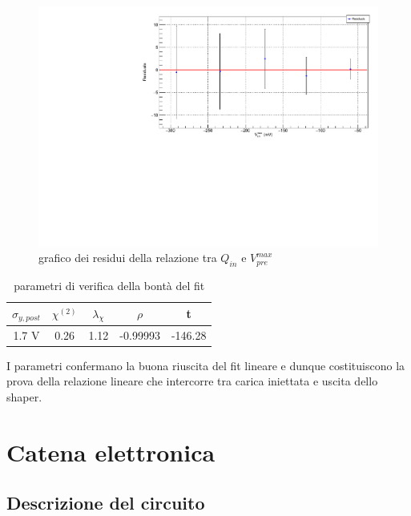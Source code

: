 \documentclass{article}
\begin{document}
\begin{center}
    \begin{figure}[H]
    \centering
    \includegraphics[scale=0.375, angle=0]{residuishaper.pdf}
    \caption{grafico dei residui della relazione tra $Q_{in}$ e $V_{pre}^{max}$}
    \label{fig:residuishaper}
    \end{figure}
\end{center}

\begin{table}[ht]
    \centering
    \begin{tabular}{ccccc}
        \toprule
        $\sigma_{y, post}$    &$\chi^{(2)}$    &$\lambda_{\chi}$   &$\rho$  &t   \\
        \midrule
        1.7 V               &0.26            &1.12              &-0.99993&-146.28\\
        \bottomrule
    \end{tabular}
    \caption{parametri di verifica della bontà del fit}
\end{table}

I parametri confermano la buona riuscita del fit lineare e dunque costituiscono la prova della relazione lineare che intercorre tra
carica iniettata e uscita dello shaper.


\section{Catena elettronica}

\subsection{Descrizione del circuito}
\end{document}
